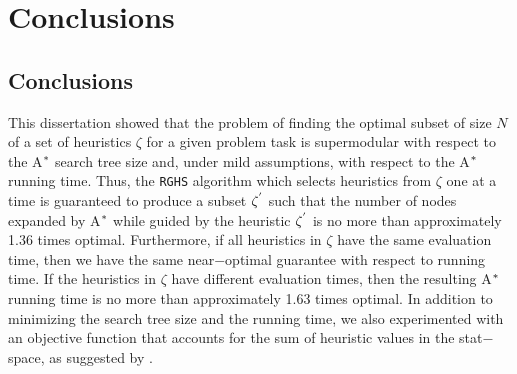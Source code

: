 
 
\chapter{Conclusions}\label{ch:conclusions}


\section{Conclusions}
\noindent
This dissertation showed that the problem of finding the optimal subset of size $N$ of a set of heuristics $\zeta$ for a given problem task is supermodular with respect to the A$\sp{*}$ search tree size and, under mild assumptions, with respect to the A$\sp{*}$ running time. Thus, the \texttt{RGHS} algorithm which selects heuristics from $\zeta$ one at a time is guaranteed to produce a subset $\zeta\sp{'}$ such that the number of nodes expanded by A$\sp{*}$ while guided by the heuristic $\zeta\sp{'}$ is no more than approximately 1.36 times optimal. Furthermore, if all heuristics in $\zeta$ have the same evaluation time, then we have the same near$-$optimal guarantee with respect to running time. If the heuristics in $\zeta$ have different evaluation times, then the resulting A$\sp{*}$ running time is no more than approximately 1.63 times optimal. In addition to minimizing the search tree size and the running time, we also experimented with an objective function that accounts for the sum of heuristic values in the stat$-$space, as suggested by \cite{raynersss13}.\\

